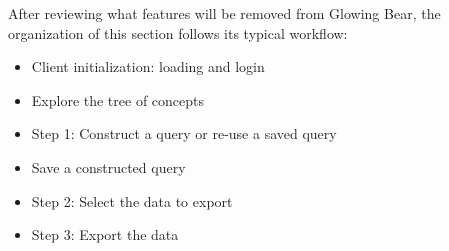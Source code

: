 After reviewing what features will be removed from Glowing Bear, the organization of this section follows its typical workflow:
\begin{itemize}
    \item Client initialization: loading and login
    \item Explore the tree of concepts
    \item Step 1: Construct a query or re-use a saved query
    \item Save a constructed query
    \item Step 2: Select the data to export
    \item Step 3: Export the data
\end{itemize}







